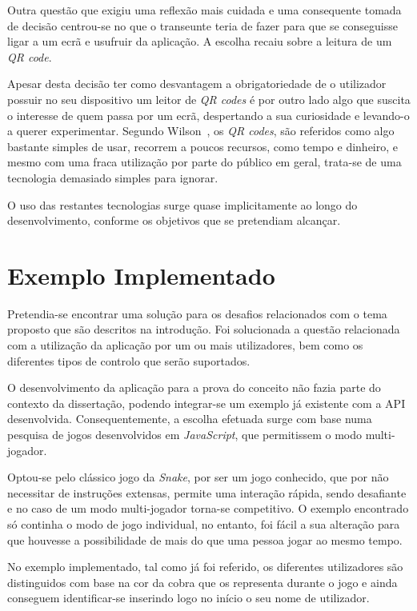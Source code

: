 Outra questão que exigiu uma reflexão mais cuidada e uma consequente tomada de decisão centrou-se no que o transeunte teria de fazer para que se conseguisse ligar a um ecrã e usufruir da aplicação. A escolha recaiu sobre a leitura de um \textit{QR code}.

Apesar desta decisão ter como desvantagem a obrigatoriedade de o utilizador possuir no seu dispositivo um leitor de \textit{QR codes} é por outro lado algo que suscita o interesse de quem passa por um ecrã, despertando a sua curiosidade e levando-o a querer experimentar. Segundo Wilson~\cite{Wilson2014}, os \textit{QR codes}, são referidos como algo bastante simples de usar, recorrem a poucos recursos, como tempo e dinheiro, e mesmo com uma fraca utilização por parte do público em geral, trata-se de uma tecnologia demasiado simples para ignorar.

O uso das restantes tecnologias surge quase implicitamente ao longo do desenvolvimento, conforme os objetivos que se pretendiam alcançar.

\section{Exemplo Implementado}

Pretendia-se encontrar uma solução para os desafios relacionados com o tema proposto que são descritos na introdução. Foi solucionada a questão relacionada com a utilização da aplicação por um ou mais utilizadores, bem como os diferentes tipos de controlo que serão suportados.

O desenvolvimento da aplicação para a prova do conceito não fazia parte do contexto da dissertação, podendo integrar-se um exemplo já existente com a API desenvolvida. Consequentemente, a escolha efetuada surge com base numa pesquisa de jogos desenvolvidos em \textit{JavaScript}, que permitissem o modo multi-jogador.

Optou-se pelo clássico jogo da \textit{Snake}, por ser um jogo conhecido, que por não necessitar de instruções extensas, permite uma interação rápida, sendo desafiante e no caso de um modo multi-jogador torna-se competitivo. O exemplo encontrado só continha o modo de jogo individual, no entanto, foi fácil a sua alteração para que houvesse a possibilidade de mais do que uma pessoa jogar ao mesmo tempo.

No exemplo implementado, tal como já foi referido, os diferentes utilizadores são distinguidos com base na cor da cobra que os representa durante o jogo e ainda conseguem identificar-se inserindo logo no início o seu nome de utilizador.

